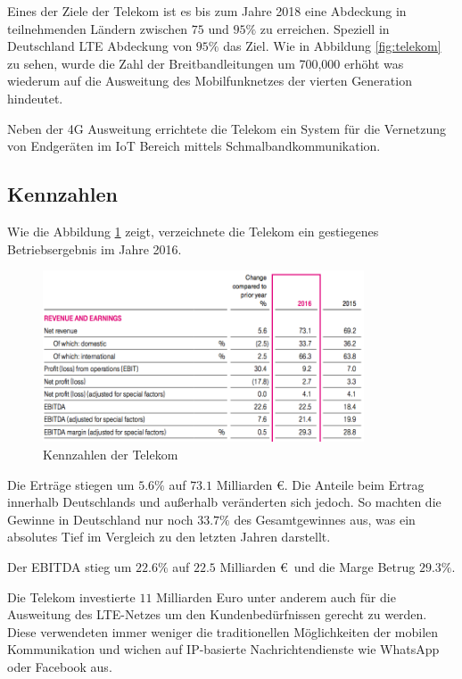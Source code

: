 Eines der Ziele der Telekom ist es bis zum Jahre 2018 eine Abdeckung in teilnehmenden Ländern zwischen $75$ und $95\%$ zu erreichen. Speziell in Deutschland LTE Abdeckung von $95\%$ das Ziel. Wie in Abbildung \ref{fig:telekom} zu sehen, wurde die Zahl der Breitbandleitungen um 700,000 erhöht was wiederum auf die Ausweitung des Mobilfunknetzes der vierten Generation hindeutet. 

Neben der 4G Ausweitung errichtete die Telekom ein System für die Vernetzung von Endgeräten im IoT Bereich mittels Schmalbandkommunikation.   

\subsection{Kennzahlen}

Wie die Abbildung \ref{fig:telekom_gewinn} zeigt, verzeichnete die Telekom ein gestiegenes Betriebsergebnis im Jahre 2016.

\begin{figure}[H]
\centering
\includegraphics[width=0.85\textwidth]{pictures/telekom_gewinn.png}
\caption{Kennzahlen der Telekom}
\label{fig:telekom_gewinn}
\end{figure}

Die Erträge stiegen um $5.6\%$ auf $73.1$ Milliarden \euro. Die Anteile beim Ertrag innerhalb Deutschlands und außerhalb veränderten sich jedoch. So machten die Gewinne in Deutschland nur noch $33.7\%$ des Gesamtgewinnes aus, was ein absolutes Tief im Vergleich zu den letzten Jahren darstellt.

Der EBITDA stieg um $22.6\%$ auf $22.5$ Milliarden \euro \ und die Marge Betrug $29.3\%$. 

Die Telekom investierte $11$ Milliarden Euro unter anderem auch für die Ausweitung des LTE-Netzes um den Kundenbedürfnissen gerecht zu werden. Diese verwendeten immer weniger die traditionellen Möglichkeiten der mobilen Kommunikation und wichen auf IP-basierte Nachrichtendienste wie WhatsApp oder Facebook aus.

